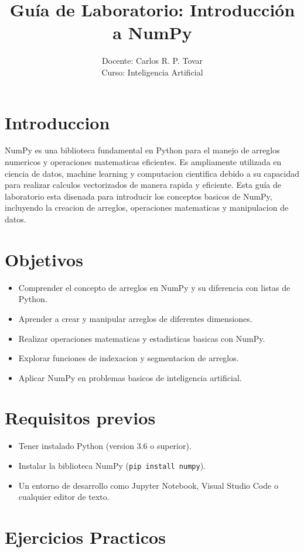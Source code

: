 \documentclass[a4paper,12pt]{article}
\title{Guía de Laboratorio: Introducción a NumPy}
\author{Docente: Carlos R. P. Tovar \\ Curso: Inteligencia Artificial}
\date{}
\begin{document}
\maketitle

\section{Introduccion}
NumPy es una biblioteca fundamental en Python para el manejo de arreglos numericos y operaciones matematicas eficientes. Es ampliamente utilizada en ciencia de datos, machine learning y computacion cientifica debido a su capacidad para realizar calculos vectorizados de manera rapida y eficiente. Esta guía de laboratorio esta disenada para introducir los conceptos basicos de NumPy, incluyendo la creacion de arreglos, operaciones matematicas y manipulacion de datos.

\section{Objetivos}
\begin{itemize}
    \item Comprender el concepto de arreglos en NumPy y su diferencia con listas de Python.
    \item Aprender a crear y manipular arreglos de diferentes dimensiones.
    \item Realizar operaciones matematicas y estadisticas basicas con NumPy.
    \item Explorar funciones de indexacion y segmentacion de arreglos.
    \item Aplicar NumPy en problemas basicos de inteligencia artificial.
\end{itemize}

\section{Requisitos previos}
\begin{itemize}
    \item Tener instalado Python (version 3.6 o superior).
    \item Instalar la biblioteca NumPy (\texttt{pip install numpy}).
    \item Un entorno de desarrollo como Jupyter Notebook, Visual Studio Code o cualquier editor de texto.
\end{itemize}

\section{Ejercicios Practicos}
\end{document}
